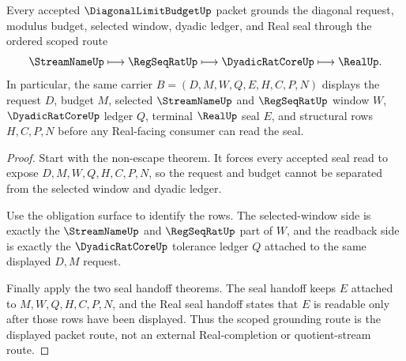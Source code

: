 \begin{theorem}
\label{thm:diagonal-limit-budget-scoped-l10-grounding}
Every accepted $\DiagonalLimitBudgetUp$ packet grounds the diagonal request, modulus budget, selected window, dyadic ledger, and Real seal through the ordered scoped route
$$
\StreamNameUp \longmapsto \RegSeqRatUp \longmapsto \DyadicRatCoreUp \longmapsto \RealUp .
$$
In particular, the same carrier $B=(D,M,W,Q,E,H,C,P,N)$ displays the request $D$, budget $M$, selected $\StreamNameUp$ and $\RegSeqRatUp$ window $W$, $\DyadicRatCoreUp$ ledger $Q$, terminal $\RealUp$ seal $E$, and structural rows $H,C,P,N$ before any Real-facing consumer can read the seal.
\end{theorem}
\begin{proof}
Start with the non-escape theorem. It forces every accepted seal read to expose $D,M,W,Q,H,C,P,N$, so the request and budget cannot be separated from the selected window and dyadic ledger.

Use the obligation surface to identify the rows. The selected-window side is exactly the $\StreamNameUp$ and $\RegSeqRatUp$ part of $W$, and the readback side is exactly the $\DyadicRatCoreUp$ tolerance ledger $Q$ attached to the same displayed $D,M$ request.

Finally apply the two seal handoff theorems. The seal handoff keeps $E$ attached to $M,W,Q,H,C,P,N$, and the Real seal handoff states that $E$ is readable only after those rows have been displayed. Thus the scoped grounding route is the displayed packet route, not an external Real-completion or quotient-stream route.
\end{proof}

